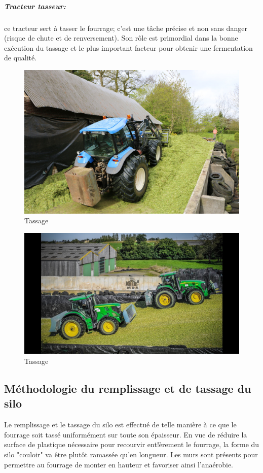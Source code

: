 \documentclass[12pt,a4paper]{report}
\begin{document}
\subparagraph{Tracteur tasseur:}ce tracteur sert à tasser le fourrage; c'est une tâche précise et non sans danger (risque de chute et de renversement). Son rôle est primordial dans la bonne exécution du tassage et le plus important facteur pour obtenir une fermentation de qualité.

\begin{figure}[H]
	\centering
	\includegraphics[width=0.7\linewidth]{img/tassage1}
	\caption{Tassage}
	\label{fig:tassage1}
\end{figure}

\begin{figure}[H]
	\centering
	\includegraphics[width=0.7\linewidth]{img/tassage2}
	\caption{Tassage}
	\label{fig:tassage2}
\end{figure}



\subsection{Méthodologie du remplissage et de tassage du silo}

Le remplissage et le tassage du silo est effectué de telle manière à ce que le fourrage soit tassé uniformément sur toute son épaisseur. En vue de réduire la surface de plastique nécessaire pour recourvir ent!èrement le  fourrage, la forme du silo "couloir" va être plutôt ramassée qu'en longueur. Les murs sont présents pour permettre au fourrage de monter en hauteur et favoriser ainsi l'anaérobie.
\newline
\end{document}

